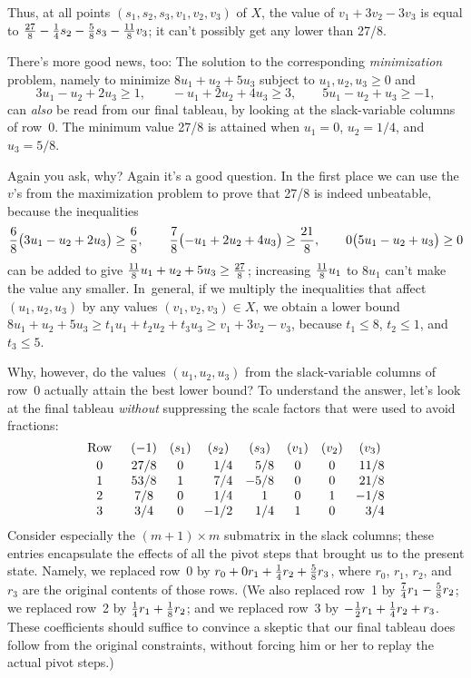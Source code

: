 Thus, at all points $(s_1,s_2,s_3,v_1,v_2,v_3)$ of $X$,
the value of $v_1+3v_2-3v_3$ is equal to
${27\over8}-{1\over4}s_2-{5\over8}s_3-{11\over8}v_3$; it can't possibly
get any lower than 27/8.

\fi

There's more good news, too: The solution to the corresponding
{\it minimization\/} problem, namely to minimize $8u_1+u_2+5u_3$ subject to
$u_1,u_2,u_3\ge0$ and
$$3u_1-u_2+2u_3\ge1,\qquad
-u_1+2u_2+4u_3\ge3,\qquad
5u_1-u_2+u_3\ge-1,$$
can {\it also\/} be read from our final tableau,
by looking at the slack-variable
columns of row~0. The minimum value 27/8 is attained when $u_1=0$,
$u_2=1/4$, and $u_3=5/8$.

Again you ask, why? Again it's a good question. In the first place we can
use the $v$'s from the maximization problem to prove that 27/8 is
indeed unbeatable, because the inequalities
$${6\over8}\bigl(3u_1-u_2+2u_3\bigr)\ge{6\over8},\qquad
{7\over8}\bigl(-u_1+2u_2+4u_3\bigr)\ge{21\over8},\qquad
0\bigl(5u_1-u_2+u_3\bigr)\ge0$$
can be added to give ${11\over8}u_1+u_2+5u_3\ge{27\over8}$; increasing
${11\over8}u_1$ to $8u_1$ can't make the value any smaller. In~general,
if we multiply the inequalities that affect $(u_1,u_2,u_3)$ by any
values $(v_1,v_2,v_3)\in X$, we obtain a lower bound
$8u_1+u_2+5u_3\ge t_1u_1+t_2u_2+t_3u_3\ge v_1+3v_2-v_3$, because
$t_1\le 8$, $t_2\le1$, and $t_3\le 5$.

Why, however, do the values $(u_1,u_2,u_3)$ from the slack-variable columns
of row~0 actually attain the best lower bound? To understand the answer,
let's look at the final tableau {\it without\/} suppressing the
scale factors that were used to avoid fractions:
$$\def\\{\phantom-}
\vcenter{\halign{\hfil$#$\hfil\enspace&&\quad\hfil$#$\hfil\cr
\rm Row&(-1)&(s_1)&(s_2)&(s_3)&(v_1)&(v_2)&(v_3)\cr
\noalign{\vskip2pt}
0&27/8&0&\\1/4&\\5/8&0&0&\\\llap11/8\cr
1&53/8&1&\\7/4&-5/8&0&0&\\\llap21/8\cr
2&7/8&0&\\1/4&\\1&0&1&-1/8\cr
3&3/4&0&-1/2&\\1/4&1&0&\\3/4\cr}}$$
Consider especially the $(m+1)\times m$ submatrix in the slack columns;
these entries encapsulate the effects of all the pivot steps that brought us to
the present state. Namely, we replaced row~0 by $r_0+0r_1+{1\over4}r_2+
{5\over8}r_3$, where $r_0$, $r_1$, $r_2$, and $r_3$ are the original
contents of those rows. (We also replaced row~1 by ${7\over4}r_1-{5\over8}r_2$;
we replaced row~2 by ${1\over4}r_1+{1\over8}r_2$; and
we replaced row~3 by $-{1\over2}r_1+{1\over4}r_2+r_3$. These coefficients
should suffice to convince a skeptic that our final tableau does follow
from the original constraints, without forcing him or her to replay
the actual pivot steps.)

